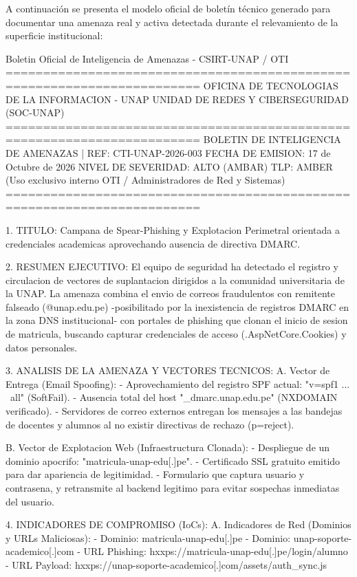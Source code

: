 A continuación se presenta el modelo oficial de boletín técnico generado para documentar una amenaza real y activa detectada durante el relevamiento de la superficie institucional:

\begin{cmdbox}{Boletin Oficial de Inteligencia de Amenazas - CSIRT-UNAP / OTI}
========================================================================
       OFICINA DE TECNOLOGIAS DE LA INFORMACION - UNAP
            UNIDAD DE REDES Y CIBERSEGURIDAD (SOC-UNAP)
========================================================================
BOLETIN DE INTELIGENCIA DE AMENAZAS | REF: CTI-UNAP-2026-003
FECHA DE EMISION: 17 de Octubre de 2026
NIVEL DE SEVERIDAD: ALTO (AMBAR)
TLP: AMBER (Uso exclusivo interno OTI / Administradores de Red y Sistemas)
========================================================================

1. TITULO:
Campana de Spear-Phishing y Explotacion Perimetral orientada a
credenciales academicas aprovechando ausencia de directiva DMARC.

2. RESUMEN EJECUTIVO:
El equipo de seguridad ha detectado el registro y circulacion de
vectores de suplantacion dirigidos a la comunidad universitaria de la
UNAP. La amenaza combina el envio de correos fraudulentos con remitente
falseado (@unap.edu.pe) -posibilitado por la inexistencia de registros
DMARC en la zona DNS institucional- con portales de phishing que clonan
el inicio de sesion de matricula, buscando capturar credenciales de
acceso (.AspNetCore.Cookies) y datos personales.

3. ANALISIS DE LA AMENAZA Y VECTORES TECNICOS:
A. Vector de Entrega (Email Spoofing):
   - Aprovechamiento del registro SPF actual: "v=spf1 ... ~all" (SoftFail).
   - Ausencia total del host "_dmarc.unap.edu.pe" (NXDOMAIN verificado).
   - Servidores de correo externos entregan los mensajes a las bandejas
     de docentes y alumnos al no existir directivas de rechazo (p=reject).

B. Vector de Explotacion Web (Infraestructura Clonada):
   - Despliegue de un dominio apocrifo: "matricula-unap-edu[.]pe".
   - Certificado SSL gratuito emitido para dar apariencia de legitimidad.
   - Formulario que captura usuario y contrasena, y retransmite al
     backend legitimo para evitar sospechas inmediatas del usuario.

4. INDICADORES DE COMPROMISO (IoCs):
   A. Indicadores de Red (Dominios y URLs Maliciosas):
      - Dominio: matricula-unap-edu[.]pe
      - Dominio: unap-soporte-academico[.]com
      - URL Phishing: hxxps://matricula-unap-edu[.]pe/login/alumno
      - URL Payload:  hxxps://unap-soporte-academico[.]com/assets/auth_sync.js


\end{cmdbox}
